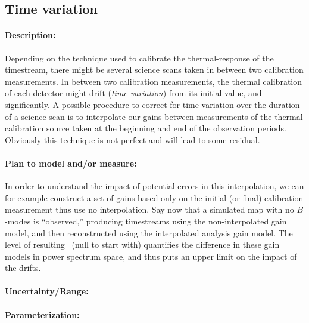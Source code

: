 \subsection{Time variation}

\paragraph{Description:}
Depending on the technique used to calibrate the thermal-response of the timestream, there might be several science scans taken in between two calibration measurements. 
In between two calibration measurements, the thermal calibration of each detector might drift (\emph{time variation}) from its initial value, and significantly.
A possible procedure to correct for time variation over the duration of a science scan is to interpolate our gains between measurements of the thermal calibration source taken at the beginning and end of the observation periods.
Obviously this technique is not perfect and will lead to some residual.

\paragraph{Plan to model and/or measure:}
In order to understand the impact of potential errors in this interpolation, we can for example construct a set of gains based only on the initial (or final) calibration measurement thus use no interpolation.
Say now that a simulated map with no $B$-modes is ``observed,'' producing timestreams using the non-interpolated gain model, and then reconstructed using the interpolated analysis gain model. 
The level of resulting \clbb\ (null to start with) quantifies the difference in these gain models in power spectrum space, and thus puts an upper limit on the impact of the drifts.

\paragraph{Uncertainty/Range:}

\paragraph{Parameterization:}